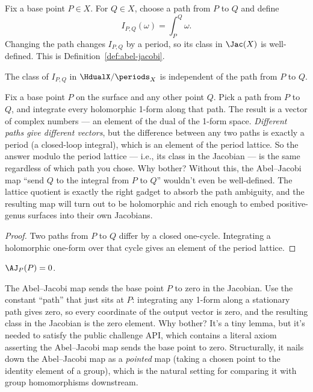 Fix a base point \(P\in X\). For \(Q\in X\), choose a path from \(P\) to \(Q\)
and define
\[
  I_{P,Q}(\omega)=\int_P^Q\omega.
\]
Changing the path changes \(I_{P,Q}\) by a period, so its class in
\(\Jac(X)\) is well-defined. This is Definition~\ref{def:abel-jacobi}.

\begin{lemma}
\label{lem:aj-path-independence}
The class of \(I_{P,Q}\) in \(\HdualX/\periods_X\) is independent of the path
from \(P\) to \(Q\).
\leanok
\end{lemma}

\begin{layman}
Fix a base point \(P\) on the surface and any other point \(Q\). Pick a
path from \(P\) to \(Q\), and integrate every holomorphic 1-form along
that path. The result is a vector of complex numbers — an element of
the dual of the 1-form space. \emph{Different paths give different
vectors}, but the difference between any two paths is exactly a
period (a closed-loop integral), which is an element of the period
lattice. So the answer modulo the period lattice — i.e., its class in
the Jacobian — is the same regardless of which path you chose. Why
bother? Without this, the Abel–Jacobi map ``send \(Q\) to the integral
from \(P\) to \(Q\)'' wouldn't even be well-defined. The lattice
quotient is exactly the right gadget to absorb the path ambiguity, and
the resulting map will turn out to be holomorphic and rich enough to
embed positive-genus surfaces into their own Jacobians.
\end{layman}

\begin{proof}
\leanok
Two paths from \(P\) to \(Q\) differ by a closed one-cycle. Integrating a
holomorphic one-form over that cycle gives an element of the period lattice.
\end{proof}

\begin{lemma}
\label{lem:aj-self}
\(\AJ_P(P)=0\).
\leanok
\end{lemma}

\begin{layman}
The Abel–Jacobi map sends the base point \(P\) to zero in the Jacobian.
Use the constant ``path'' that just sits at \(P\): integrating any
1-form along a stationary path gives zero, so every coordinate of the
output vector is zero, and the resulting class in the Jacobian is the
zero element. Why bother? It's a tiny lemma, but it's needed to satisfy
the public challenge API, which contains a literal axiom asserting the
Abel–Jacobi map sends the base point to zero. Structurally, it nails
down the Abel–Jacobi map as a \emph{pointed} map (taking a chosen
point to the identity element of a group), which is the natural setting
for comparing it with group homomorphisms downstream.
\end{layman}

